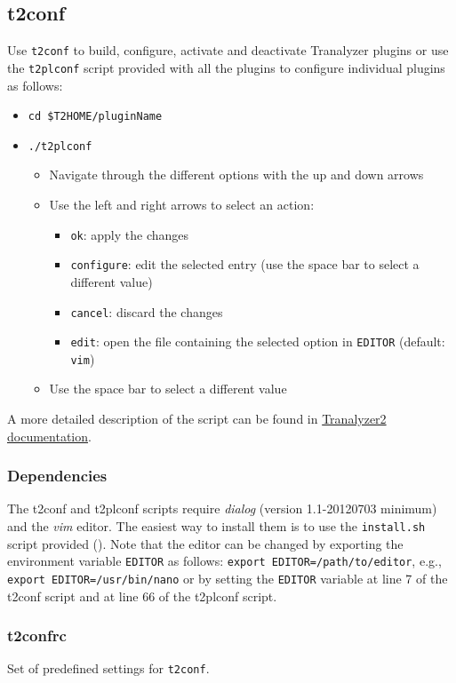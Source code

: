 \documentclass[documentation]{subfiles}
\begin{document}
\subsection{t2conf}\label{t2conf}
Use {\tt t2conf} to build, configure, activate and deactivate Tranalyzer plugins or use the {\tt t2plconf} script provided with all the plugins to configure individual plugins as follows:
\begin{itemize}
    \item {\tt cd \$T2HOME/pluginName}
    \item {\tt ./t2plconf}
        \begin{itemize}
            \item Navigate through the different options with the up and down arrows
            \item Use the left and right arrows to select an action:
                \begin{itemize}
                    \item {\tt ok}: apply the changes
                    \item {\tt configure}: edit the selected entry (use the space bar to select a different value)
                    \item {\tt cancel}: discard the changes
                    \item {\tt edit}: open the file containing the selected option in {\tt EDITOR} (default: {\tt vim})
                \end{itemize}
            \item Use the space bar to select a different value
        \end{itemize}
\end{itemize}
A more detailed description of the script can be found in \href{../../tranalyzer2/doc/tranalyzer2.pdf}{Tranalyzer2 documentation}.
\subsubsection{Dependencies}
The t2conf and t2plconf scripts require {\em dialog} (version 1.1-20120703 minimum) and the {\em vim} editor.
The easiest way to install them is to use the {\tt install.sh} script provided ().
Note that the editor can be changed by exporting the environment variable {\tt EDITOR} as follows: {\tt export EDITOR=/path/to/editor}, e.g., {\tt export EDITOR=/usr/bin/nano} or
by setting the {\tt EDITOR} variable at line 7 of the t2conf script and at line 66 of the t2plconf script.
\subsubsection{t2confrc}
Set of predefined settings for {\tt t2conf}.
\end{document}
